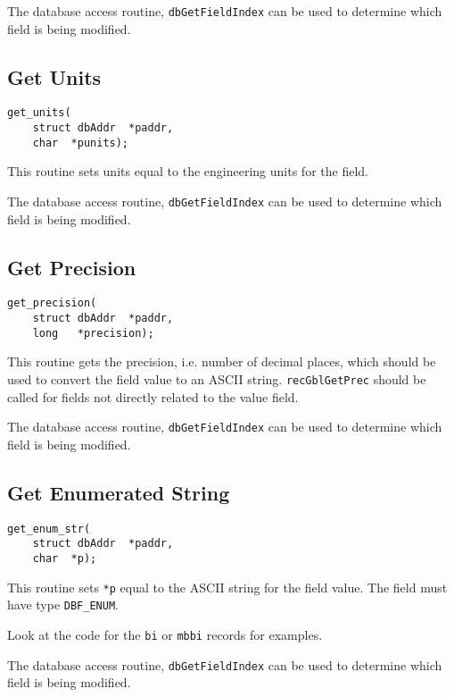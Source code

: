 The database access routine, \verb|dbGetFieldIndex| can be used to determine which field is being modified.

\subsection{Get Units}

\begin{verbatim}
get_units(
    struct dbAddr  *paddr,
    char  *punits);
\end{verbatim}

This routine sets units equal to the engineering units for the field.

The database access routine, \verb|dbGetFieldIndex| can be used to determine which field is being modified.

\subsection{Get Precision}

\begin{verbatim}
get_precision(
    struct dbAddr  *paddr,
    long   *precision);
\end{verbatim}

This routine gets the precision, i.e.
number of decimal places, which should be used to convert the field value to an ASCII string.
\verb|recGblGetPrec| should be called for fields not directly related to the value field.

The database access routine, \verb|dbGetFieldIndex| can be used to determine which field is being modified.

\subsection{Get Enumerated String}

\begin{verbatim}
get_enum_str(
    struct dbAddr  *paddr,
    char  *p);
\end{verbatim}

This routine sets \verb|*p| equal to the ASCII string for the field value.
The field must have type \verb|DBF_ENUM|.

Look at the code for the \verb|bi| or \verb|mbbi| records for examples.

The database access routine, \verb|dbGetFieldIndex| can be used to determine which field is being modified.

